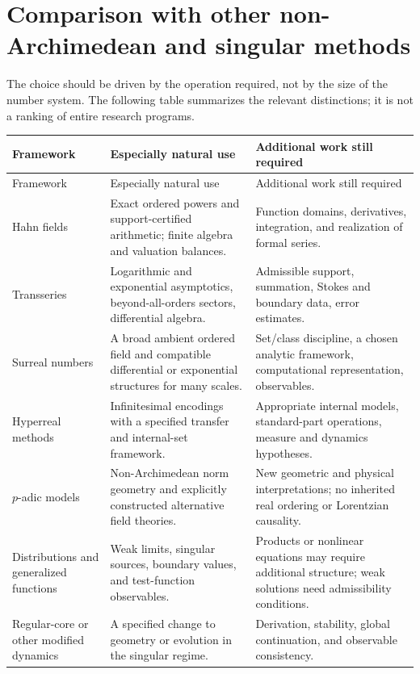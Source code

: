 \documentclass[11pt,a4paper]{article}
\numberwithin{equation}{section}
\theoremstyle{definition}
\theoremstyle{remark}
\begin{document}
\section{Comparison with other non-Archimedean and singular methods}
\label{sec:comparison}

The choice should be driven by the operation required, not by the size of the number system. The following table summarizes the relevant distinctions; it is not a ranking of entire research programs.

\begin{longtable}{@{}>{\raggedright\arraybackslash}p{}>{\raggedright\arraybackslash}p{}>{\raggedright\arraybackslash}p{}@{}}
\toprule
Framework & Especially natural use & Additional work still required \\
\midrule
\endfirsthead
\toprule
Framework & Especially natural use & Additional work still required \\
\midrule
\endhead
Hahn fields & Exact ordered powers and support-certified arithmetic; finite algebra and valuation balances. & Function domains, derivatives, integration, and realization of formal series. \\
\addlinespace
Transseries & Logarithmic and exponential asymptotics, beyond-all-orders sectors, differential algebra. & Admissible support, summation, Stokes and boundary data, error estimates. \\
\addlinespace
Surreal numbers & A broad ambient ordered field and compatible differential or exponential structures for many scales. & Set/class discipline, a chosen analytic framework, computational representation, observables. \\
\addlinespace
Hyperreal methods & Infinitesimal encodings with a specified transfer and internal-set framework. & Appropriate internal models, standard-part operations, measure and dynamics hypotheses. \\
\addlinespace
$p$-adic models & Non-Archimedean norm geometry and explicitly constructed alternative field theories. & New geometric and physical interpretations; no inherited real ordering or Lorentzian causality. \\
\addlinespace
Distributions and generalized functions & Weak limits, singular sources, boundary values, and test-function observables. & Products or nonlinear equations may require additional structure; weak solutions need admissibility conditions. \\
\addlinespace
Regular-core or other modified dynamics & A specified change to geometry or evolution in the singular regime. & Derivation, stability, global continuation, and observable consistency. \\
\bottomrule
\end{longtable}
\end{document}
